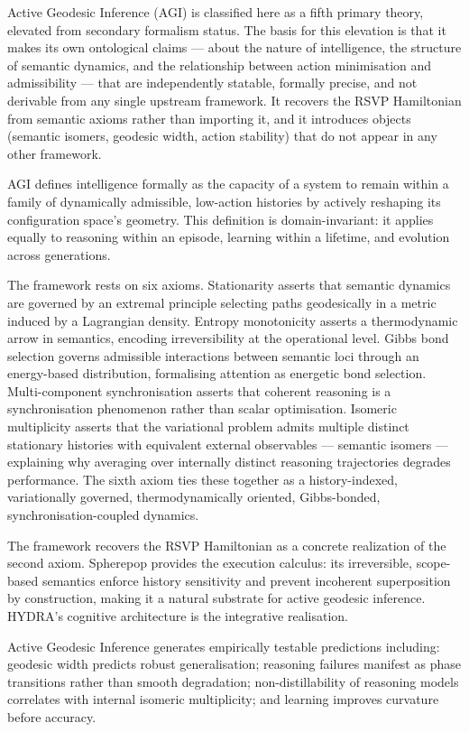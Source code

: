 \documentclass[12pt, twoside]{article}
\begin{document}
Active Geodesic Inference (AGI) is classified here as a fifth primary theory,
elevated from secondary formalism status. The basis for this elevation is that
it makes its own ontological claims — about the nature of intelligence, the
structure of semantic dynamics, and the relationship between action minimisation
and admissibility — that are independently statable, formally precise, and not
derivable from any single upstream framework. It recovers the RSVP Hamiltonian
from semantic axioms rather than importing it, and it introduces objects
(semantic isomers, geodesic width, action stability) that do not appear in any
other framework.

AGI defines intelligence formally as the capacity of a system to remain within
a family of dynamically admissible, low-action histories by actively reshaping
its configuration space's geometry. This definition is domain-invariant: it
applies equally to reasoning within an episode, learning within a lifetime, and
evolution across generations.

The framework rests on six axioms. Stationarity asserts that semantic dynamics are governed by an extremal principle selecting paths geodesically in a metric induced by a Lagrangian density. Entropy monotonicity asserts a thermodynamic arrow in semantics, encoding irreversibility at the operational level. Gibbs bond selection governs admissible interactions between semantic loci through an energy-based distribution, formalising attention as energetic bond selection. Multi-component synchronisation asserts that coherent reasoning is a synchronisation phenomenon rather than scalar optimisation. Isomeric multiplicity asserts that the variational problem admits multiple distinct stationary histories with equivalent external observables --- semantic isomers --- explaining why averaging over internally distinct reasoning trajectories degrades performance. The sixth axiom ties these together as a history-indexed, variationally governed, thermodynamically oriented, Gibbs-bonded, synchronisation-coupled dynamics.

The framework recovers the RSVP Hamiltonian as a concrete realization of the second axiom. Spherepop provides the execution calculus: its irreversible, scope-based semantics enforce history sensitivity and prevent incoherent superposition by construction, making it a natural substrate for active geodesic inference. HYDRA's cognitive architecture is the integrative realisation.

Active Geodesic Inference generates empirically testable predictions including: geodesic width predicts robust generalisation; reasoning failures manifest as phase transitions rather than smooth degradation; non-distillability of reasoning models correlates with internal isomeric multiplicity; and learning improves curvature before accuracy.
\end{document}
